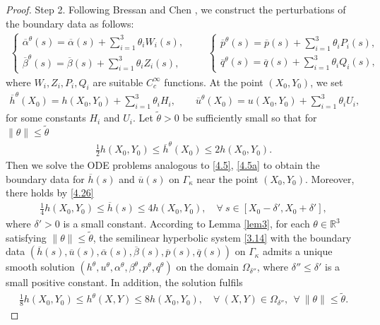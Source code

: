 \documentclass[11pt,reqno]{article}
\newcommand{\fr}{\frac}
\numberwithin{equation}{section}
\begin{document}
\begin{proof}
Step 2. Following Bressan and Chen \cite{BC1}, we construct the perturbations of the boundary data as follows:
\begin{align}\label{4.24}
\left\{
\begin{array}{l}
\overline{\alpha}^{\theta}(s)=\overline{\alpha}(s)+\sum_{i=1}^3\theta_iW_i(s), \\
\overline{\beta}^{\theta}(s)=\overline{\beta}(s)+\sum_{i=1}^3\theta_iZ_i(s),
\end{array}
\right.
\qquad
\left\{
\begin{array}{l}
\overline{p}^{\theta}(s)=\overline{p}(s)+\sum_{i=1}^3\theta_iP_i(s), \\
\overline{q}^{\theta}(s)=\overline{q}(s)+\sum_{i=1}^3\theta_iQ_i(s),
\end{array}
\right.
\end{align}
where $W_i, Z_i, P_i, Q_i$ are suitable $C_{c}^\infty$ functions. At the point $(X_0, Y_0)$, we set
\begin{align}\label{4.25}
\overline{h}^{\theta}(X_0)=h(X_0, Y_0)+\sum_{i=1}^3\theta_iH_i,\qquad \overline{u}^{\theta}(X_0)=u(X_0, Y_0)+\sum_{i=1}^3\theta_iU_i,
\end{align}
for some constants $H_i$ and $U_i$. Let $\tilde{\theta}>0$ be sufficiently small so that for $\|\theta\|\leq \tilde{\theta}$
\begin{align}\label{4.26}
\fr{1}{2}h(X_0, Y_0)\leq \overline{h}^{\theta}(X_0)\leq 2h(X_0, Y_0).
\end{align}
Then we solve the ODE problems analogous to \eqref{4.5}, \eqref{4.5a} to obtain the boundary data for $\overline{h}(s)$ and $\overline{u}(s)$ on $\Gamma_\kappa$ near the point $(X_0,Y_0)$. Moreover, there holds by \eqref{4.26}
\begin{align}\label{4.27}
\fr{1}{4}h(X_0, Y_0)\leq \overline{h}(s)\leq 4h(X_0, Y_0),\quad \forall\ s\in[X_0-\delta', X_0+\delta'],
\end{align}
where $\delta'>0$ is a small constant. According to Lemma \ref{lem3}, for each $\theta\in\mathbb{R}^3$ satisfying $\|\theta\|\leq \tilde{\theta}$, the semilinear hyperbolic system \eqref{3.14} with the boundary data $(\overline{h}(s), \overline{u}(s), \overline{\alpha}(s), \overline{\beta}(s), \overline{p}(s), \overline{q}(s))$ on $\Gamma_\kappa$ admits a unique smooth solution $(h^\theta, u^\theta, \alpha^\theta, \beta^\theta, p^\theta, q^\theta)$ on the domain $\Omega_{\delta''}$, where $\delta''\leq \delta'$ is a small positive constant. In addition, the solution fulfils
\begin{align}\label{4.28}
\fr{1}{8}h(X_0, Y_0)\leq h^\theta(X,Y)\leq 8h(X_0, Y_0),\quad \forall\ (X,Y)\in\Omega_{\delta''},\ \ \forall\ \|\theta\|\leq \tilde{\theta}.
\end{align}


\end{proof}
\end{document}

